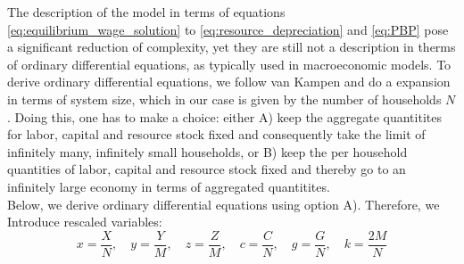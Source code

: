 The description of the model in terms of equations \eqref{eq:equilibrium_wage_solution} to \eqref{eq:resource_depreciation} and \eqref{eq:PBP} pose a significant reduction of complexity, yet they are still not a description in therms of ordinary differential equations, as typically used in macroeconomic models. To derive ordinary differential equations, we follow van Kampen and do a expansion in terms of system size, which in our case is given by the number of households $N$.
Doing this, one has to make a choice: either A) keep the aggregate quantitites for labor, capital and resource stock fixed and consequently take the limit of infinitely many, infinitely small households, or B) keep the per household quantities of labor, capital and resource stock fixed and thereby go to an infinitely large economy in terms of aggregated quantitites. \\
Below, we derive ordinary differential equations using option A). Therefore, we Introduce rescaled variables:
\begin{equation}
	x = \frac{X}{N}, \quad y = \frac{Y}{M}, \quad z = \frac{Z}{M}, \quad c = \frac{C}{N}, \quad g = \frac{G}{N}, \quad k = \frac{2M}{N}
\end{equation}

